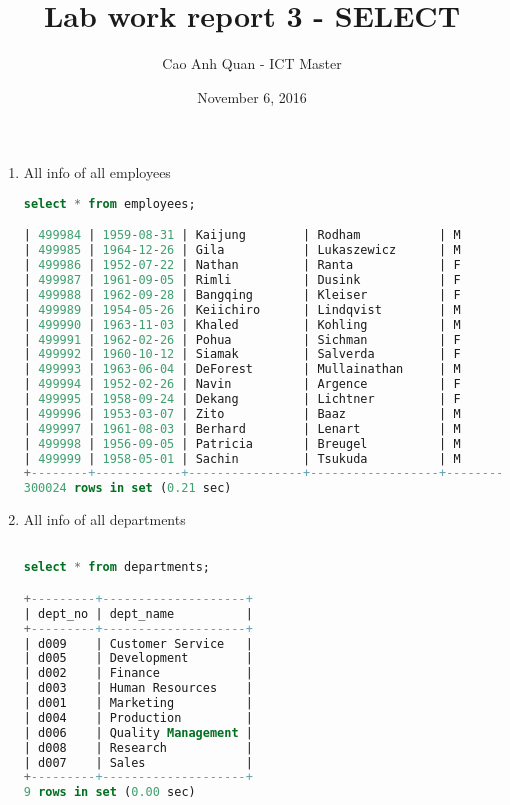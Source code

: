 \documentclass[12pt, letterpaper, twoside]{article}
\title{Lab work report 3 - SELECT}
\author{Cao Anh Quan - ICT Master}
\date{November 6, 2016}
\begin{document}
 
\begin{titlepage}
\maketitle
\end{titlepage}

\begin{enumerate}

\item All info of all employees
\begin{lstlisting}[language=SQL]
select * from employees;

| 499984 | 1959-08-31 | Kaijung        | Rodham           | M      | 1985-09-11 |
| 499985 | 1964-12-26 | Gila           | Lukaszewicz      | M      | 1997-02-11 |
| 499986 | 1952-07-22 | Nathan         | Ranta            | F      | 1985-08-11 |
| 499987 | 1961-09-05 | Rimli          | Dusink           | F      | 1998-09-20 |
| 499988 | 1962-09-28 | Bangqing       | Kleiser          | F      | 1986-06-06 |
| 499989 | 1954-05-26 | Keiichiro      | Lindqvist        | M      | 1993-10-28 |
| 499990 | 1963-11-03 | Khaled         | Kohling          | M      | 1985-10-10 |
| 499991 | 1962-02-26 | Pohua          | Sichman          | F      | 1989-01-12 |
| 499992 | 1960-10-12 | Siamak         | Salverda         | F      | 1987-05-10 |
| 499993 | 1963-06-04 | DeForest       | Mullainathan     | M      | 1997-04-07 |
| 499994 | 1952-02-26 | Navin          | Argence          | F      | 1990-04-24 |
| 499995 | 1958-09-24 | Dekang         | Lichtner         | F      | 1993-01-12 |
| 499996 | 1953-03-07 | Zito           | Baaz             | M      | 1990-09-27 |
| 499997 | 1961-08-03 | Berhard        | Lenart           | M      | 1986-04-21 |
| 499998 | 1956-09-05 | Patricia       | Breugel          | M      | 1993-10-13 |
| 499999 | 1958-05-01 | Sachin         | Tsukuda          | M      | 1997-11-30 |
+--------+------------+----------------+------------------+--------+------------+
300024 rows in set (0.21 sec)


\end{lstlisting}

\item All info of all departments
\begin{lstlisting}[language=SQL]

select * from departments;

+---------+--------------------+
| dept_no | dept_name          |
+---------+--------------------+
| d009    | Customer Service   |
| d005    | Development        |
| d002    | Finance            |
| d003    | Human Resources    |
| d001    | Marketing          |
| d004    | Production         |
| d006    | Quality Management |
| d008    | Research           |
| d007    | Sales              |
+---------+--------------------+
9 rows in set (0.00 sec)


\end{lstlisting}
\end{enumerate}
\end{document}
